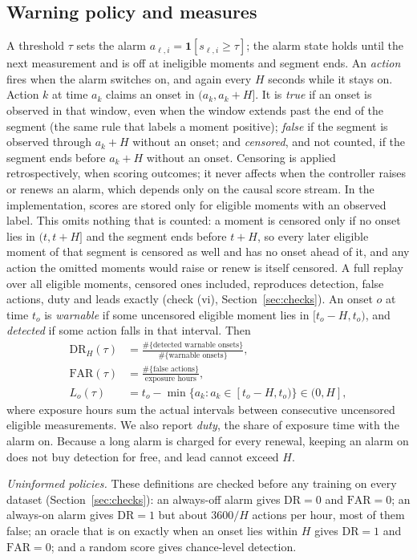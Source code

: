 \documentclass[preprint,review,12pt]{elsarticle}
\newcommand{\FAR}{\mathrm{FAR}}
\newcommand{\DR}{\mathrm{DR}}
\begin{document}
\subsection{Warning policy and measures}
\label{sec:measures}
A threshold $\tau$ sets the alarm $a_{\ell,i}=\mathbf{1}[s_{\ell,i}\ge\tau]$; the
alarm state holds until the next measurement and is off at ineligible moments and
segment ends. An \emph{action} fires when the alarm switches on, and again every $H$
seconds while it stays on. Action $k$ at time $a_k$ claims an onset in
$(a_k,a_k+H]$. It is \emph{true} if an onset is observed in that window, even when
the window extends past the end of the segment (the same rule that labels a moment
positive); \emph{false} if the segment is observed through $a_k+H$ without an onset;
and \emph{censored}, and not counted, if the segment ends before $a_k+H$ without an
onset. Censoring is applied retrospectively, when scoring outcomes; it never affects
when the controller raises or renews an alarm, which depends only on the causal
score stream. In the implementation, scores are stored only for eligible moments with
an observed label. This omits nothing that is counted: a moment is censored only if no
onset lies in $(t,t+H]$ and the segment ends before $t+H$, so every later eligible moment
of that segment is censored as well and has no onset ahead of it, and any action the
omitted moments would raise or renew is itself censored. A full replay over all
eligible moments, censored ones included, reproduces detection, false actions, duty
and leads exactly (check (vi), Section~\ref{sec:checks}). An onset $o$ at
time $t_o$ is \emph{warnable} if some uncensored eligible moment lies in
$[t_o-H,t_o)$, and \emph{detected} if some action falls in that interval. Then
\begin{align}
\DR_H(\tau) &= \frac{\#\{\text{detected warnable onsets}\}}{\#\{\text{warnable onsets}\}},
\label{eq:dr}\\
\FAR(\tau) &= \frac{\#\{\text{false actions}\}}{\text{exposure hours}},
\label{eq:far}\\
L_o(\tau) &= t_o - \min\{a_k : a_k\in[t_o-H,t_o)\}\in(0,H],
\label{eq:lead}
\end{align}
where exposure hours sum the actual intervals between consecutive uncensored
eligible measurements. We also report \emph{duty}, the share of exposure time with
the alarm on. Because a long alarm is charged for every renewal, keeping an alarm on
does not buy detection for free, and lead cannot exceed $H$.

\emph{Uninformed policies.} These definitions are checked before any training on
every dataset (Section~\ref{sec:checks}): an always-off alarm gives $\DR=0$ and
$\FAR=0$; an always-on alarm gives $\DR=1$ but about $3600/H$ actions per hour, most
of them false; an oracle that is on exactly when an onset lies within $H$ gives
$\DR=1$ and $\FAR=0$; and a random score gives chance-level detection.
\end{document}
